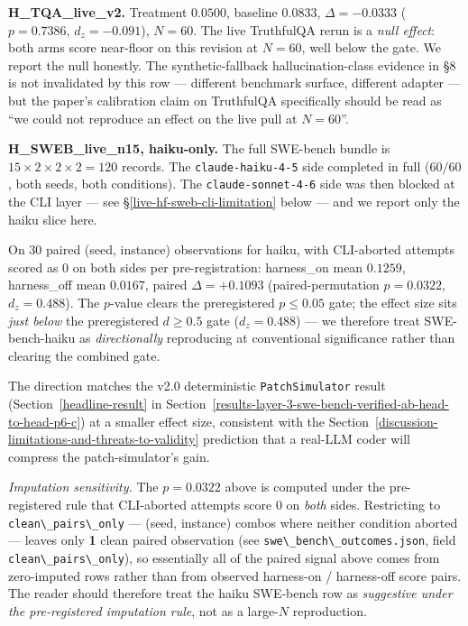 \textbf{H\_TQA\_live\_v2.} Treatment $0.0500$, baseline $0.0833$,
$\Delta=-0.0333$ ($p=0.7386$, $d_z=-0.091$), $N=60$. The live
TruthfulQA rerun is a \emph{null effect}: both arms score near-floor on
this revision at $N=60$, well below the gate. We report the null
honestly. The synthetic-fallback hallucination-class evidence in
§8 is not invalidated by this row --- different benchmark surface,
different adapter --- but the paper's calibration claim on TruthfulQA
specifically should be read as ``we could not reproduce an effect on
the live pull at $N=60$''.

\textbf{H\_SWEB\_live\_n15, haiku-only.} The full SWE-bench bundle is
$15 \times 2 \times 2 \times 2 = 120$ records. The
\passthrough{\lstinline!claude-haiku-4-5!} side completed in full
($60/60$, both seeds, both conditions). The
\passthrough{\lstinline!claude-sonnet-4-6!} side was then blocked at the
CLI layer --- see §\ref{live-hf-sweb-cli-limitation} below --- and we
report only the haiku slice here.

On 30 paired (seed, instance) observations for haiku, with CLI-aborted
attempts scored as $0$ on both sides per pre-registration: harness\_on
mean $0.1259$, harness\_off mean $0.0167$, paired $\Delta=+0.1093$
(paired-permutation $p=0.0322$, $d_z=0.488$). The $p$-value clears the
preregistered $p \le 0.05$ gate; the effect size sits
\emph{just below} the preregistered $d \ge 0.5$ gate ($d_z=0.488$) --- we
therefore treat SWE-bench-haiku as \emph{directionally} reproducing at
conventional significance rather than clearing the combined gate.

The direction matches the v2.0 deterministic
\passthrough{\lstinline!PatchSimulator!} result
(Section~\ref{headline-result} in
Section~\ref{results-layer-3-swe-bench-verified-ab-head-to-head-p6-c}) at
a smaller effect size, consistent with the
Section~\ref{discussion-limitations-and-threats-to-validity} prediction
that a real-LLM coder will compress the patch-simulator's gain.

\emph{Imputation sensitivity.} The $p=0.0322$ above is computed under
the pre-registered rule that CLI-aborted attempts score $0$ on
\emph{both} sides. Restricting to
\passthrough{\lstinline!clean\_pairs\_only!} --- (seed, instance) combos
where neither condition aborted --- leaves only
\textbf{1} clean paired observation (see
\passthrough{\lstinline!swe\_bench\_outcomes.json!}, field
\passthrough{\lstinline!clean\_pairs\_only!}), so essentially all of
the paired signal above comes from zero-imputed rows rather than from
observed harness-on / harness-off score pairs. The reader should
therefore treat the haiku SWE-bench row as \emph{suggestive under the
pre-registered imputation rule}, not as a large-$N$ reproduction.

